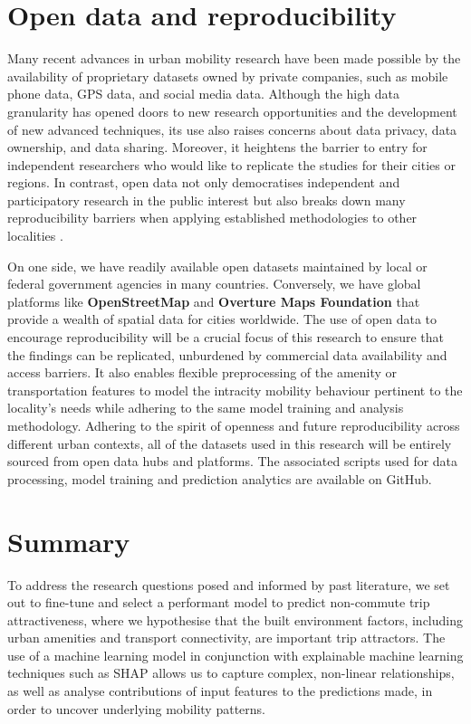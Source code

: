 \section{Open data and reproducibility}

Many recent advances in urban mobility research have been made possible by the availability of proprietary datasets owned by private companies, such as mobile phone data, GPS data, and social media data. Although the high data granularity has opened doors to new research opportunities and the development of new advanced techniques, its use also raises concerns about data privacy, data ownership, and data sharing. Moreover, it heightens the barrier to entry for independent researchers who would like to replicate the studies for their cities or regions. In contrast, open data not only democratises independent and participatory research in the public interest but also breaks down many reproducibility barriers when applying established methodologies to other localities \citep{yadavRoleOpenData2017}.

On one side, we have readily available open datasets maintained by local or federal government agencies in many countries. Conversely, we have global platforms like \textbf{OpenStreetMap} and \textbf{Overture Maps Foundation} that provide a wealth of spatial data for cities worldwide. The use of open data to encourage reproducibility will be a crucial focus of this research to ensure that the findings can be replicated, unburdened by commercial data availability and access barriers. It also enables flexible preprocessing of the amenity or transportation features to model the intracity mobility behaviour pertinent to the locality's needs while adhering to the same model training and analysis methodology. Adhering to the spirit of openness and future reproducibility across different urban contexts, all of the datasets used in this research will be entirely sourced from open data hubs and platforms. The associated scripts used for data processing, model training and prediction analytics are available on GitHub.

\section{Summary}

To address the research questions posed and informed by past literature, we set out to fine-tune and select a performant model to predict non-commute trip attractiveness, where we hypothesise that the built environment factors, including urban amenities and transport connectivity, are important trip attractors. The use of a machine learning model in conjunction with explainable machine learning techniques such as SHAP allows us to capture complex, non-linear relationships, as well as analyse contributions of input features to the predictions made, in order to uncover underlying mobility patterns.